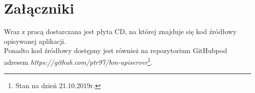 \documentclass[../main.tex]{subfiles}
\begin{document}
\section{Załączniki}
Wraz z pracą dostarczana jest płyta CD, na której znajduje się kod źródłowy opisywanej aplikacji.
\\
Ponadto kod źródłowy dostępny jest również na repozytorium GitHub\newline pod adresem \textit{https://github.com/ptr97/hm-apiserver}\footnote{Stan na dzień 21.10.2019r.}.
\end{document}
